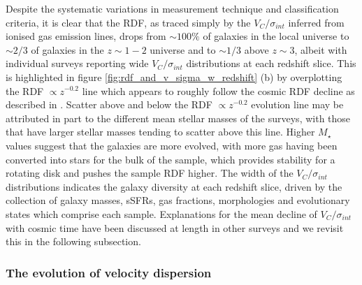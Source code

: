 \documentclass[fleqn,usenatbib]{mn2e}
\begin{document}
Despite the systematic variations in measurement technique and classification criteria, it is clear that the RDF, as traced simply by the $V_{C}/\sigma_{int}$ inferred from ionised gas emission lines, drops from $\sim 100\%$ of galaxies in the local universe to $\sim 2/3$ of galaxies in the $z \sim 1-2$ universe and to $\sim 1/3$ above $z \sim 3$, albeit with individual surveys reporting wide $V_{C}/\sigma_{int}$ distributions at each redshift slice.
This is highlighted in figure \ref{fig:rdf_and_v_sigma_w_redshift} (b) by overplotting the RDF $\propto z^{-0.2}$ line which appears to roughly follow the cosmic RDF decline as described in \cite{Stott2016}. 
Scatter above and below the RDF $\propto z^{-0.2}$ evolution line may be attributed in part to the different mean stellar masses of the surveys, with those that have larger stellar masses tending to scatter above this line.
Higher $M_{\star}$ values suggest that the galaxies are more evolved, with more gas having been converted into stars for the bulk of the sample, which provides stability for a rotating disk and pushes the sample RDF higher.
The width of the $V_{C}/\sigma_{int}$ distributions indicates the galaxy diversity at each redshift slice, driven by the collection of galaxy masses, sSFRs, gas fractions, morphologies and evolutionary states which comprise each sample.
Explanations for the mean decline of $V_{C}/\sigma_{int}$ with cosmic time have been discussed at length in other surveys \citep[e.g][]{ForsterSchreiber2009,Law2009,Wisnioski2015} and we revisit this in the following subsection.

\subsubsection{The evolution of velocity dispersion}\label{subsubsec:sigma_evolution}
\end{document}
